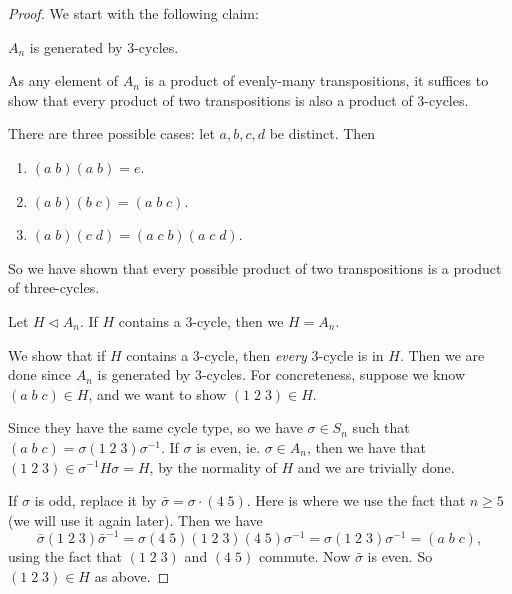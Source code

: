 \documentclass[a4paper]{article}
\begin{document}
\begin{proof}
  We start with the following claim:
  \begin{claim}
    $A_n$ is generated by $3$-cycles.
  \end{claim}
  As any element of $A_n$ is a product of evenly-many transpositions, it suffices to show that every product of two transpositions is also a product of $3$-cycles.

  There are three possible cases: let $a, b, c, d$ be distinct. Then
  \begin{enumerate}
    \item $(a\; b)(a\; b) = e$.
    \item $(a\; b)(b\; c) = (a\; b\; c)$.
    \item $(a\; b)(c\; d) = (a\; c\; b)(a\; c\; d)$.
  \end{enumerate}
  So we have shown that every possible product of two transpositions is a product of three-cycles.

  \begin{claim}
    Let $H \lhd A_n$. If $H$ contains a $3$-cycle, then we $H = A_n$.
  \end{claim}
  We show that if $H$ contains a $3$-cycle, then \emph{every} $3$-cycle is in $H$. Then we are done since $A_n$ is generated by $3$-cycles. For concreteness, suppose we know $(a\; b\; c) \in H$, and we want to show $(1\; 2\; 3) \in H$.

  Since they have the same cycle type, so we have $\sigma \in S_n$ such that $(a\; b\; c) = \sigma(1\; 2\; 3) \sigma^{-1}$. If $\sigma$ is even, ie. $\sigma \in A_n$, then we have that $(1\; 2\; 3) \in \sigma^{-1}H\sigma = H$, by the normality of $H$ and we are trivially done.

  If $\sigma$ is odd, replace it by $\bar{\sigma} = \sigma \cdot (4\; 5)$. Here is where we use the fact that $n \geq 5$ (we will use it again later). Then we have
  \[
    \bar{\sigma} (1\; 2\; 3) \bar{\sigma}^{-1} = \sigma (4\; 5)(1\; 2\; 3)(4\; 5) \sigma^{-1} = \sigma(1\; 2\; 3) \sigma^{-1} = (a\; b\; c),
  \]
  using the fact that $(1\; 2\; 3)$ and $(4\; 5)$ commute. Now $\bar{\sigma}$ is even. So $(1\; 2\; 3) \in H$ as above.


\end{proof}
\end{document}
